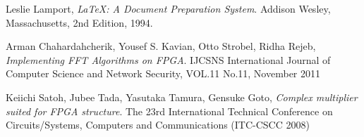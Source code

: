 
\begin{thebibliography}{9}


  Leslie Lamport,
  \emph{\LaTeX: A Document Preparation System}.
  Addison Wesley, Massachusetts,
  2nd Edition,
  1994.

  Arman Chahardahcherik, Yousef S. Kavian, Otto Strobel, Ridha Rejeb, 
  \emph{Implementing FFT Algorithms on FPGA}.
  IJCSNS International Journal of Computer Science and Network Security, 
  VOL.11 No.11,   
  November 2011 
  
  Keiichi Satoh, Jubee Tada, Yasutaka Tamura, Gensuke Goto, 
  \emph{Complex multiplier suited for FPGA structure}.
  The 23rd International Technical Conference on Circuits/Systems,
  Computers and Communications (ITC-CSCC 2008)

  
\end{thebibliography}

